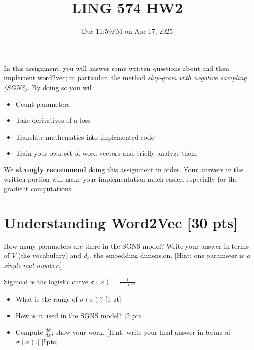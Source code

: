\documentclass[11pt]{article}
\begin{document}
\title{LING 574 HW2}
\date{\vspace{-0.2in}Due 11:59PM on Apr 17, 2025}
\maketitle


In this assignment, you will answer some written questions about and then implement word2vec; in particular, the method \emph{skip-gram with negative sampling (SGNS)}.  By doing so you will:
\begin{itemize}
  \item Count parameters
  \item Take derivatives of a loss
  \item Translate mathematics into implemented code
  \item Train your own set of word vectors and briefly analyze them
\end{itemize}
We \textbf{strongly recommend} doing this assignment in order.  Your answers in the written portion will make your implementation much easier, especially for the gradient computations.


\section{Understanding Word2Vec [30 pts]}

  How many parameters are there in the SGNS model?  Write your answer in terms of $V$ (the vocabulary) and $d_e$, the embedding dimension.  [Hint: one parameter is \emph{a single real number}.]


\vspace{2em}
  Sigmoid is the logistic curve $\sigma(x) = \frac{1}{1+e^{-x}}$.
\begin{itemize}
  \item What is the range of $\sigma(x)$? [1 pt]
  \item How is it used in the SGNS model? [2 pts]
  \item Compute $\frac{d\sigma}{dx}$; show your work.  [Hint: write your final answer in terms of $\sigma(x)$.] [5pts]
\end{itemize}
\end{document}
